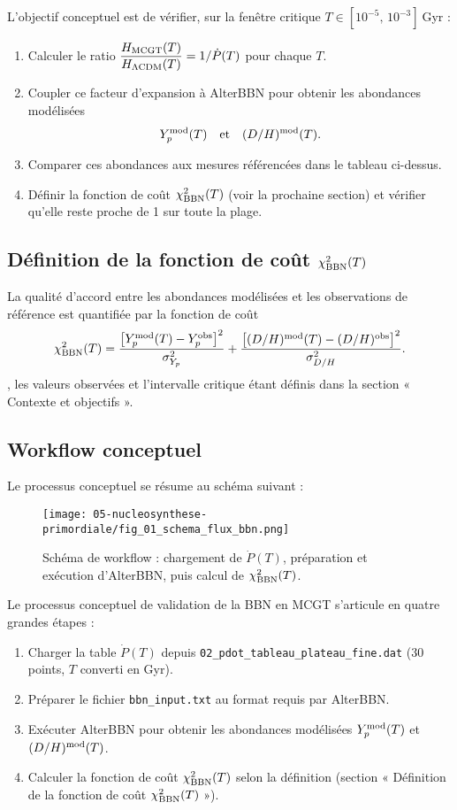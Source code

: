 L’objectif conceptuel est de vérifier, sur la fenêtre critique \(T\in[10^{-5},\,10^{-3}]\) Gyr :
\begin{enumerate}
  \item Calculer le ratio \(\displaystyle \frac{H_{\rm MCGT}(T)}{H_{\Lambda\mathrm{CDM}}(T)} = 1/\dot P(T)\) pour chaque \(T\).
  \item Coupler ce facteur d’expansion à AlterBBN pour obtenir les abondances modélisées
    \[
      Y_{p}^{\rm mod}(T)
      \quad\text{et}\quad
      (D/H)^{\rm mod}(T).
    \]
  \item Comparer ces abondances aux mesures référencées dans le tableau ci-dessus.
  \item Définir la fonction de coût \(\chi^{2}_{\rm BBN}(T)\) (voir la prochaine section) et vérifier qu’elle reste proche de 1 sur toute la plage.
\end{enumerate}

\subsection{Définition de la fonction de coût \(\chi^{2}_{\rm BBN}(T)\)}

La qualité d’accord entre les abondances modélisées et les observations de référence est quantifiée par la fonction de coût
\[
  \chi^{2}_{\rm BBN}(T)
  =
  \frac{\bigl[Y_{p}^{\rm mod}(T) - Y_{p}^{\rm obs}\bigr]^{2}}{\sigma_{Y_{p}}^{2}}
  +
  \frac{\bigl[(D/H)^{\rm mod}(T) - (D/H)^{\rm obs}\bigr]^{2}}{\sigma_{D/H}^{2}}.
\]
, les valeurs observées et l’intervalle critique étant définis dans la section « Contexte et objectifs ».

\subsection{Workflow conceptuel}

Le processus conceptuel se résume au schéma suivant :

\begin{figure}[htbp]
  \centering
  \texttt{[image: 05-nucleosynthese-primordiale/fig\_01\_schema\_flux\_bbn.png]}
  \caption{Schéma de workflow : chargement de \(\dot P(T)\), préparation et exécution d’AlterBBN, puis calcul de \(\chi^2_{\rm BBN}(T)\).}
  \label{fig:flux_nucleosynthese}
\end{figure}

Le processus conceptuel de validation de la BBN en MCGT s’articule en quatre grandes étapes :
\begin{enumerate}
  \item Charger la table \(\dot P(T)\) depuis \texttt{02\_pdot\_tableau\_plateau\_fine.dat} (30 points, \(T\) converti en Gyr).
  \item Préparer le fichier \texttt{bbn\_input.txt} au format requis par AlterBBN.
  \item Exécuter AlterBBN pour obtenir les abondances modélisées \(Y_{p}^{\rm mod}(T)\) et \((D/H)^{\rm mod}(T)\).
  \item Calculer la fonction de coût \(\chi^{2}_{\rm BBN}(T)\) selon la définition (section « Définition de la fonction de coût \(\chi^{2}_{\rm BBN}(T)\) »).
\end{enumerate}

